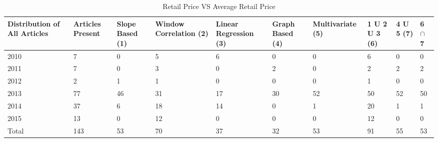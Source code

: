 \documentclass[a4paper,10pt]{report}
\begin{document}
      

	\begin{table}[]
	\centering
	\resizebox{\textwidth}{!}
	{\begin{tabular}{|l|l|l|l|l|l|l|l|l|l|}
	\hline
	Distribution of All Articles & Articles Present & Slope Based (1) & Window Correlation (2) & Linear Regression (3) & Graph Based (4) & Multivariate (5) & 1 U 2 U 3 (6) & 4 U 5 (7) & 6  $\cap$ 7 \\
	\hline
	2010                         & 7                & 0           & 5           & 6                 & 0           & 0             & 6         & 0     & 0                                     \\
	\hline
	2011                         & 7                & 0           & 3           & 0                 & 2           & 0             & 2         & 2     & 2                                     \\
	\hline
	2012                         & 2                & 1           & 1           & 0                 & 0           & 0             & 1         & 0     & 0                                     \\
	\hline
	2013                         & 77               & 46          & 31          & 17                & 30          & 52            & 50        & 52    & 50                                    \\
	\hline
	2014                         & 37               & 6           & 18          & 14                & 0           & 1             & 20        & 1     & 1                                     \\
	\hline
	2015                         & 13               & 0           & 12          & 0                 & 0           & 0             & 12        & 0     & 0                                     \\
	\hline
	Total                        & 143              & 53          & 70          & 37                & 32          & 53            & 91        & 55    & 53                                   \\
	\hline
	\end{tabular}}	
	\caption{Retail Price VS Average Retail Price}
	\label{RetailVsAverage}
	\end{table}
	
	
	
\end{document}
